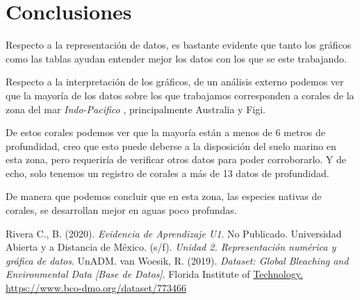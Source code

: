 \documentclass[12pt]{article}
\begin{document}
\section{Conclusiones}

	\par Respecto a la representación de datos, es bastante evidente que tanto los gráficos como las tablas ayudan entender mejor los datos con los que se este trabajando.
	\par Respecto a la interpretación de los gráficos, de un análisis externo podemos ver que la mayoría de los datos sobre los que trabajamos corresponden a corales de la zona del mar \textit{ Indo-Pacifico }, principalmente Australia y Figi. 
	\par De estos corales podemos ver que la mayoría están a menos de 6 metros de profundidad, creo que esto puede deberse a la disposición del suelo marino en esta zona, pero requeriría de verificar otros datos para poder corroborarlo. Y de echo, solo tenemos un registro de corales a más de 13 datos de profundidad.
	\par De manera que podemos concluir que en esta zona, las especies nativas de corales, se desarrollan mejor en aguas poco profundas.




\begin{thebibliography}{X}
	 Rivera C., B. (2020). \textit{Evidencia de Aprendizaje U1}. No Publicado.
	 Universidad Abierta y a Distancia de México. (s/f). \textit{Unidad 2. Representación numérica y gráfica de datos}. UnADM.
	 van Woesik, R. (2019). \textit{Dataset: Global Bleaching and Environmental Data [Base de Datos]}. Florida Institute of \url{Technology. https://www.bco-dmo.org/dataset/773466}
 
\end{thebibliography}
\end{document}
